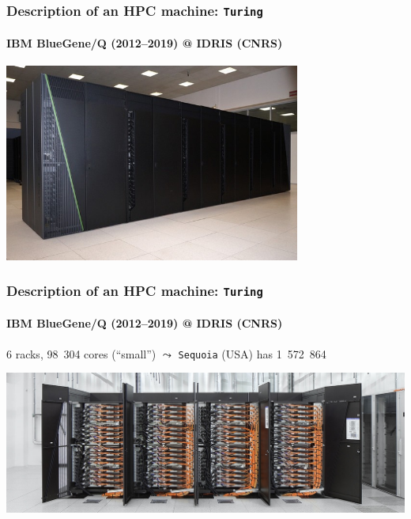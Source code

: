 \documentclass[xcolor={x11names,svgnames,psnames}]{beamer}
\begin{document}

\begin{frame}
  \frametitle{Description of an HPC machine: \texttt{Turing}}
  \framesubtitle{IBM BlueGene/Q (2012--2019) @ IDRIS (CNRS)}
  
  \begin{center}
    \includegraphics[height=6.5cm]{turing}
  \end{center}
\end{frame}


\begin{frame}
  \frametitle{Description of an HPC machine: \texttt{Turing}}
  \framesubtitle{IBM BlueGene/Q (2012--2019) @ IDRIS (CNRS)}

  6 racks, 98~304 cores (``small'') $\leadsto$ \texttt{Sequoia} (USA) has 1~572~864
  
  \begin{center}
    \includegraphics[width=\textwidth]{bgq}
  \end{center}
\end{frame}

\end{document}
